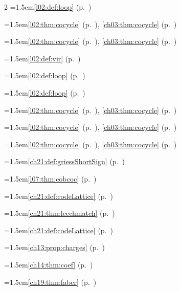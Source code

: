 \begin{multicols}{2}
\hangindent=1.5em\quad \ref{l02:def:loop} (p.~\pageref{l02:def:loop})\par
\hangindent=1.5em\quad \ref{l02:thm:cocycle} (p.~\pageref{l02:thm:cocycle}), \ref{ch03:thm:cocycle} (p.~\pageref{ch03:thm:cocycle})\par
\hangindent=1.5em\quad \ref{l02:thm:cocycle} (p.~\pageref{l02:thm:cocycle}), \ref{ch03:thm:cocycle} (p.~\pageref{ch03:thm:cocycle})\par
\hangindent=1.5em\quad \ref{l02:def:vir} (p.~\pageref{l02:def:vir})\par
\hangindent=1.5em\quad \ref{l02:def:loop} (p.~\pageref{l02:def:loop})\par
\hangindent=1.5em\quad \ref{l02:def:loop} (p.~\pageref{l02:def:loop})\par
\hangindent=1.5em\quad \ref{l02:thm:cocycle} (p.~\pageref{l02:thm:cocycle}), \ref{ch03:thm:cocycle} (p.~\pageref{ch03:thm:cocycle})\par
\hangindent=1.5em\quad \ref{l02:thm:cocycle} (p.~\pageref{l02:thm:cocycle}), \ref{ch03:thm:cocycle} (p.~\pageref{ch03:thm:cocycle})\par
\hangindent=1.5em\quad \ref{l02:thm:cocycle} (p.~\pageref{l02:thm:cocycle}), \ref{ch03:thm:cocycle} (p.~\pageref{ch03:thm:cocycle})\par
\hangindent=1.5em\quad \ref{ch21:def:griessShortSign} (p.~\pageref{ch21:def:griessShortSign})\par
\hangindent=1.5em\quad \ref{l07:thm:cobcoc} (p.~\pageref{l07:thm:cobcoc})\par
\hangindent=1.5em\quad \ref{ch21:def:codeLattice} (p.~\pageref{ch21:def:codeLattice})\par
\hangindent=1.5em\quad \ref{ch21:thm:leechmatch} (p.~\pageref{ch21:thm:leechmatch})\par
\hangindent=1.5em\quad \ref{ch21:def:codeLattice} (p.~\pageref{ch21:def:codeLattice})\par
\hangindent=1.5em\quad \ref{ch13:prop:charges} (p.~\pageref{ch13:prop:charges})\par
\hangindent=1.5em\quad \ref{ch14:thm:coef} (p.~\pageref{ch14:thm:coef})\par
\hangindent=1.5em\quad \ref{ch19:thm:faber} (p.~\pageref{ch19:thm:faber})\par

\end{multicols}
